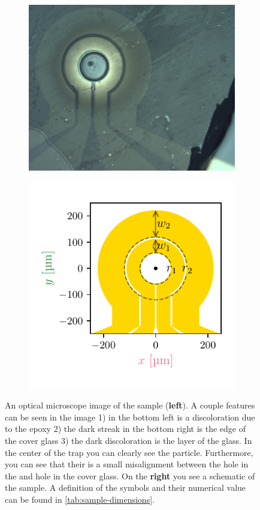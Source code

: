 \begin{figure}
    \centering
    \begin{subfigure}[c]{.5\textwidth}
        \centering
        \includegraphics{figures/sample/trap_optical_microscope.pdf}
    \end{subfigure}%
    \begin{subfigure}[c]{.5\textwidth}
        \centering
        \includegraphics{figures/sample/trap_geometry.pdf}
    \end{subfigure}%
    \caption{An optical microscope image of the sample (\textbf{left}). A couple features can be seen in the image 1) in the bottom left is a discoloration due to the epoxy 2) the dark streak in the bottom right is the edge of the cover glass 3) the dark discoloration is the  layer of the glass. In the center of the trap you can clearly see the  particle. Furthermore, you can see that their is a small misalignment between the hole in the  and hole in the cover glass. On the \textbf{right} you see a schematic of the sample. A definition of the symbols and their numerical value can be found in \autoref{tab:sample-dimensions}.}
    \label{fig:sample-dimensions}
\end{figure}

